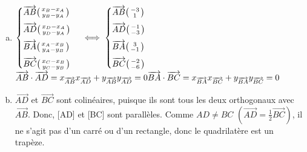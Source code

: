 \documentclass[12pt, a4paper]{article}
\begin{document}
\begin{Exercise}[number={72}]
  \begin{enumerate}[a)]
    \item $\begin{cases}\overrightarrow{AB}\begin{psmallmatrix}x_B-x_A\\y_B-y_A\end{psmallmatrix}\\[0.2cm] \overrightarrow{AD}\begin{psmallmatrix}x_D-x_A\\y_D-y_A\end{psmallmatrix} \\[0.2cm] \overrightarrow{BA}\begin{psmallmatrix}x_A-x_B\\y_A-y_B\end{psmallmatrix} \\[0.2cm] \overrightarrow{BC}\begin{psmallmatrix}x_C-x_B\\y_C-y_B\end{psmallmatrix}\end{cases} \iff \begin{cases}\overrightarrow{AB}\begin{psmallmatrix}-3\\1\end{psmallmatrix}\\[0.2cm] \overrightarrow{AD}\begin{psmallmatrix}-1\\-3\end{psmallmatrix} \\[0.2cm] \overrightarrow{BA}\begin{psmallmatrix}3\\-1\end{psmallmatrix} \\[0.2cm] \overrightarrow{BC}\begin{psmallmatrix}-2\\-6\end{psmallmatrix}\end{cases}$ \medbreak $\overrightarrow{AB}\cdot\overrightarrow{AD}=x_{\overrightarrow{AB}}x_{\overrightarrow{AD}}+y_{\overrightarrow{AB}}y_{\overrightarrow{AD}}=0 \\ \overrightarrow{BA}\cdot\overrightarrow{BC}=x_{\overrightarrow{BA}}x_{\overrightarrow{BC}}+y_{\overrightarrow{BA}}y_{\overrightarrow{BC}}=0$
    \item $\overrightarrow{AD}$ et $\overrightarrow{BC}$ sont colinéaires, puisque ils sont tous les deux orthogonaux avec $\overrightarrow{AB}$. Donc, [AD] et [BC] sont parallèles. Comme $AD\neq BC$ $(\overrightarrow{AD}=\frac{1}{2}\overrightarrow{BC})$, il ne s'agit pas d'un carré ou d'un rectangle, donc le quadrilatère est un trapèze.
  \end{enumerate}
\end{Exercise}
\end{document}
